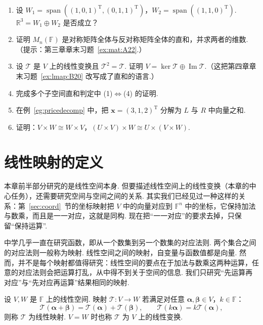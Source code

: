 \documentclass[lang=cn,10.5pt,scheme=chinese,toc=twocol,section,chinesefont=nofont,
twoside,citestyle=gb7714-2015,bibstyle=gb7714-2015]{elegantbook}
\DeclareRobustCommand{\textbf}[1]{{\lnsemiboldlatin\lnsemiboldcjk #1}}
\newcommand{\vv}[1]{\boldsymbol{#1}}
\newcommand{\trans}{\mathrm{T}}             %
\numberwithin{equation}{section}   %
\newcommand{\spn}{\operatorname{span}}      %
\newcommand{\imm}{\operatorname{Im}}        %
\newcommand*{\lnlabel}[1]{{\sffamily\bfseries\color{black}#1}}
\renewenvironment{exercise}[1][]{%
	\refstepcounter{exer}%
	\par\noindent\makebox[-3pt][r]{\scriptsize\color{black}\HandPencilLeft\quad}%
	\lnlabel{\exercisename\ \theexer\ifblank{#1}{}{\ #1}}\ \rmfamily}{%
	\par\ignorespacesafterend}
\begin{document}
\begin{exercise}
  \begin{enumerate}
    \item 设 $W_1=\spn((1,0,1)^\trans,(0,1,1)^\trans)$，$W_2=\spn((1,1,0)^\trans)$. $\mathbb{R}^3=W_1\oplus W_2$ 是否成立？
    \item 证明 $M_n(\mathbb{F})$ 是对称矩阵全体与反对称矩阵全体的直和，并求两者的维数.（提示：第三章章末习题~\ref{ex:mat:A22}.）
    \item 设 $\mathscr T$ 是 $V$ 上的线性变换且 $\mathscr T^2=\mathscr T$. 证明 $V=\ker\mathscr T\oplus\imm\mathscr T$.（这把第四章章末习题~\ref{ex:lmap:B20} 改写成了直和的语言.）
    \item 完成多个子空间直和判定中 (1)$\Leftrightarrow$(4) 的证明.
    \item 在例~\ref{eg:pricedecomp} 中，把 $\vv x=(3,1,2)^\trans$ 分解为 $L$ 与 $R$ 中向量之和.
    \item 证明：$V\times W\cong W\times V$，$(U\times V)\times W\cong U\times(V\times W)$.
  \end{enumerate}
\end{exercise}

\section{线性映射的定义}

本章前半部分研究的是线性空间本身. 但要描述线性空间上的线性变换（本章的中心任务），还需要研究空间与空间之间的关系. 其实我们已经见过一种这样的关系：第~\ref{sec:coord}~节的坐标映射把 $V$ 中的向量对应到 $\mathbb{F}^n$ 中的坐标，它保持加法与数乘，而且是一一对应，这就是同构. 现在把“一一对应”的要求去掉，只保留“保持运算”.

中学几乎一直在研究函数，即从一个数集到另一个数集的对应法则. 两个集合之间的对应法则一般称为\textbf{映射}. 线性空间之间的映射，自变量与函数值都是向量. 然而，并不是每个映射都值得研究：线性空间的要点在于加法与数乘这两种运算，任意的对应法则会把运算打乱，从中得不到关于空间的信息. 我们只研究“先运算再对应”与“先对应再运算”结果相同的映射.

\begin{definition}
  设 $V,W$ 是 $\mathbb{F}$ 上的线性空间. 映射 $\mathscr T:V\to W$ 若满足对任意 $\vv\alpha,\vv\beta\in V$，$k\in\mathbb{F}$：
  \[
    \mathscr T(\vv\alpha+\vv\beta)=\mathscr T(\vv\alpha)+\mathscr T(\vv\beta),\qquad \mathscr T(k\vv\alpha)=k\mathscr T(\vv\alpha),
  \]
  则称 $\mathscr T$ 为\textbf{线性映射}. $V=W$ 时也称 $\mathscr T$ 为 $V$ 上的\textbf{线性变换}.
\end{definition}
\end{document}
